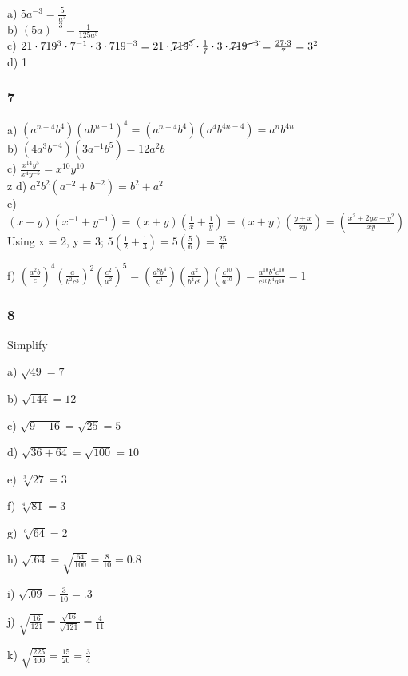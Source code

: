 \documentclass[]{report}
\begin{document}
a) $5a^{-3}  =  \frac{5}{a^3}$ \\
b) $(5a)^{-3} = \frac{1}{125a^3}$ \\
c) $21 \cdot 719^3 \cdot 7^{-1} \cdot 3 \cdot 719^{-3} = 21 \cdot \cancel{719^3} \cdot \frac{1}{7} \cdot 3 \cdot \cancel{719^{-3}}  = \frac{27 \cdot 3}{7} = 3^2$ \\
d) 1 \\

\subsubsection{7}
a)  $(a^{n-4}b^4)(ab^{n-1})^4 = (a^{n-4}b^4)(a^4b^{4n -4}) = a^nb^{4n}$ \\
b)  $(4a^3b^{-4})(3a^{-1}b^5) = 12a^2b$ \\
c)  $\frac{x^{14}y^5}{x^4y^{-5}} = x^{10}y^{10}$ \\z
d)  $a^2b^2(a^{-2} + b^{-2}) = b^2 + a^2$ \\
e)  $(x+y)(x^{-1} + y^{-1}) =  (x+y)(\frac{1}{x}+\frac{1}{y}) = (x+y)(\frac{y + x}{xy}) = (\frac{x^2 + 2yx + y^2}{xy})$ \\

Using x = 2, y = 3;
$5 (\frac{1}{2}+\frac{1}{3}) = 5 (\frac{5}{6}) = \frac{25}{6}$

f)  $(\frac{a^2b}{c})^4(\frac{a}{b^2c^3})^2(\frac{c^2}{a^2})^5 = (\frac{a^8b^4}{c^4})(\frac{a^2}{b^4c^6})(\frac{c^{10}}{a^{10}}) = \frac{a^{10}b^4c^{10}}{c^{10}b^4a^{10}} = 1$ \\


\subsubsection{8}
Simplify


a) $\sqrt{49} = 7$


b) $\sqrt{144} = 12$

c) $\sqrt{9  + 16} = \sqrt{25} = 5$

d) $\sqrt{36+ 64} = \sqrt{100} = 10$

e) $\sqrt[3]{27} = 3$

f) $\sqrt[4]{81} = 3$

g) $\sqrt[6]{64} = 2$

h) $\sqrt{.64} = \sqrt{\frac{64}{100}} = \frac{8}{10} = 0.8$

i) $\sqrt{.09} = \frac{3}{10} = .3$

j) $\sqrt{\frac{16}{121}} = \frac{\sqrt{16}}{\sqrt{121}} = \frac{4}{11}$

k) $\sqrt{\frac{225}{400}} = \frac{15}{20} = \frac{3}{4}$
\end{document}
